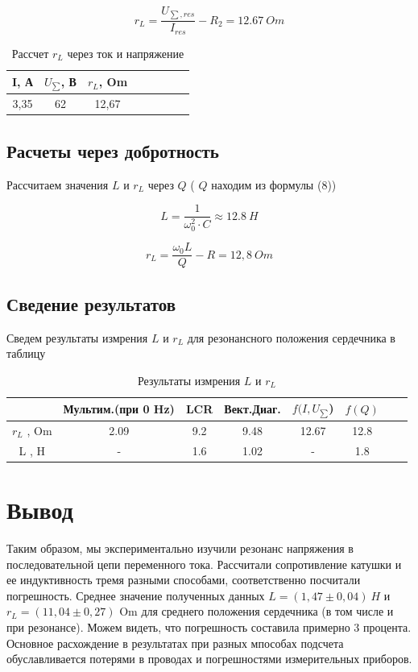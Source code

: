 $$
r_{L} = \frac{U_{\sum,res}}{I_{res}} - R_2 = 12.67 \: Om
$$


\begin{table}[h!]
	\centering
	\caption{Рассчет $ r_{L}$ через ток и напряжение }
	\begin{tabular}{|c|c|c|c|c|c|c|c|}
		\hline
		 I, А &  $U_{\sum}$, В & $ r_{L}$, Om \\
		\hline
		  3,35 & 62 &  12,67\\
		 \hline
	\end{tabular}%
\label{resT}%
\end{table}%


\subsection{Расчеты через добротность}
Рассчитаем значения $ L $ и $ r_{L} $ через $ Q $ ( $ Q $ находим из формулы (8))

$$
L = \frac{1}{\omega_{0}^2\cdot C} \approx  12.8 \: H
$$

$$
r_{L} = \frac{{\omega_{0}}{L}}{Q} - R = 12,8 \: Om
$$


\subsection{Сведение результатов}
Сведем результаты измрения $ L $ и $ r_{L} $ для резонансного положения сердечника в таблицу 

\begin{table}[h!]
	\centering
	\caption{ Результаты измрения $ L $ и $ r_{L} $ }
	\begin{tabular}{|c|c|c|c|c|c|c|c|}
		\hline
		  &  Мультим.(при 0 Hz) & LCR & Вект.Диаг. &  $ f( I ,  U_{\sum} $) & $ f( Q )$   \\
		\hline
		$r_{L}$ , Om  & 2.09  & 9.2 & 9.48 & 12.67 & 12.8\\
		\hline
		 L , H & - & 1.6 & 1.02 & - & 1.8 \\
		\hline
	\end{tabular}%
\label{resT}%
\end{table}%


\section{Вывод}
Таким образом, мы экспериментально изучили резонанс напряжения в последовательной цепи переменного тока. Рассчитали сопротивление катушки и ее индуктивность тремя разными способами, соответственно посчитали погрешность.
\newline
Среднее значение полученных данных $ L  = (1,47 \pm0,04) \: H $ и $r_{L} = (11,04 \pm 0,27)$ Om для среднего положения сердечника (в том числе и при резонансе). 
\newline
Можем видеть, что погрешность составила примерно 3 процента. Основное расхождение в результатах при разных мпособах подсчета обуславливается потерями в проводах и погрешностями измерительных приборов.

